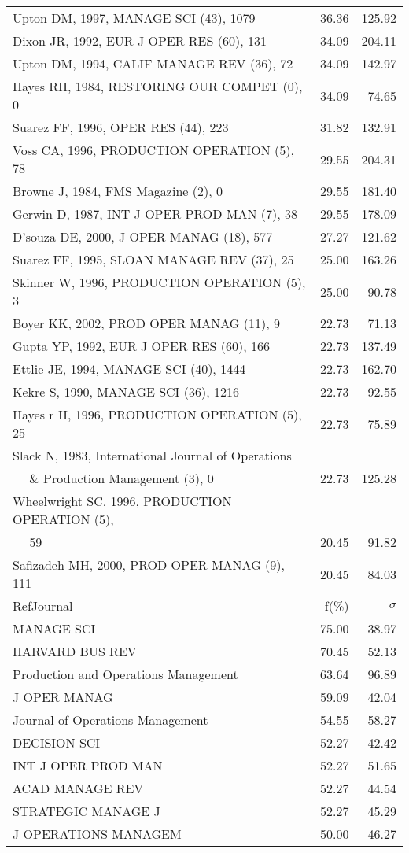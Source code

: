 \documentclass[a4paper,11pt]{report}
\begin{document}
\begin{landscape}
\begin{table}[!ht]
{\begin{tabular}{|l r r|}
Upton DM, 1997, MANAGE SCI (43), 1079 & 36.36 & 125.92\\
Dixon JR, 1992, EUR J OPER RES (60), 131 & 34.09 & 204.11\\
Upton DM, 1994, CALIF MANAGE REV (36), 72 & 34.09 & 142.97\\
Hayes RH, 1984, RESTORING OUR COMPET (0), 0 & 34.09 & 74.65\\
Suarez FF, 1996, OPER RES (44), 223 & 31.82 & 132.91\\
Voss CA, 1996, PRODUCTION OPERATION (5), 78 & 29.55 & 204.31\\
Browne J, 1984, FMS Magazine (2), 0 & 29.55 & 181.40\\
Gerwin D, 1987, INT J OPER PROD MAN (7), 38 & 29.55 & 178.09\\
D'souza DE, 2000, J OPER MANAG (18), 577 & 27.27 & 121.62\\
Suarez FF, 1995, SLOAN MANAGE REV (37), 25 & 25.00 & 163.26\\
Skinner W, 1996, PRODUCTION OPERATION (5), 3 & 25.00 & 90.78\\
Boyer KK, 2002, PROD OPER MANAG (11), 9 & 22.73 & 71.13\\
Gupta YP, 1992, EUR J OPER RES (60), 166 & 22.73 & 137.49\\
Ettlie JE, 1994, MANAGE SCI (40), 1444 & 22.73 & 162.70\\
Kekre S, 1990, MANAGE SCI (36), 1216 & 22.73 & 92.55\\
Hayes r H, 1996, PRODUCTION OPERATION (5), 25 & 22.73 & 75.89\\
Slack N, 1983, International Journal of Operations &  & \\
$\quad$ \& Production Management (3), 0 & 22.73 & 125.28\\
Wheelwright SC, 1996, PRODUCTION OPERATION (5), &  & \\
$\quad$ 59 & 20.45 & 91.82\\
Safizadeh MH, 2000, PROD OPER MANAG (9), 111 & 20.45 & 84.03\\
\hline
\hline
RefJournal & f(\%) & $\sigma$\\
\hline
MANAGE SCI & 75.00 & 38.97\\
HARVARD BUS REV & 70.45 & 52.13\\
Production and Operations Management & 63.64 & 96.89\\
J OPER MANAG & 59.09 & 42.04\\
Journal of Operations Management & 54.55 & 58.27\\
DECISION SCI & 52.27 & 42.42\\
INT J OPER PROD MAN & 52.27 & 51.65\\
ACAD MANAGE REV & 52.27 & 44.54\\
STRATEGIC MANAGE J & 52.27 & 45.29\\
J OPERATIONS MANAGEM & 50.00 & 46.27\\
\hline
\end{tabular}
}
\end{table}


\end{landscape}
\end{document}
